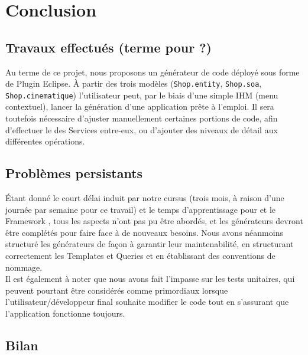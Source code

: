 \chapter{Conclusion}\label{chap:COnc}


\section{Travaux effectués (terme pour  ?)}

Au terme de ce projet, nous proposons un générateur de code déployé sous forme de Plugin Eclipse. À partir des trois modèles (\verb+Shop.entity+, \verb+Shop.soa+, \verb+Shop.cinematique+) l'utilisateur peut, par le biais d'une simple IHM (menu contextuel), lancer la génération d'une application \kwplay prête à l'emploi. Il sera toutefois nécessaire d'ajuster manuellement certaines portions de code, afin d'effectuer le  des Services entre-eux, ou d'ajouter des niveaux de détail aux différentes opérations.


\section{Problèmes persistants}

Étant donné le court délai induit par notre cursus (trois mois, à raison d'une journée par semaine pour ce travail) et le temps d'apprentissage pour \kwacceleo et le Framework \kwplay, tous les aspects n'ont pas pu être abordés, et les générateurs devront être complétés pour faire face à de nouveaux besoins. Nous avons néanmoins structuré les générateurs de façon à garantir leur maintenabilité, en structurant correctement les Templates et Queries et en établissant des conventions de nommage.\\
Il est également à noter que nous avons fait l'impasse sur les tests unitaires, qui peuvent pourtant être considérés comme primordiaux lorsque l'utilisateur/développeur final souhaite modifier le code tout en s'assurant que l'application fonctionne toujours.

\section{Bilan}

